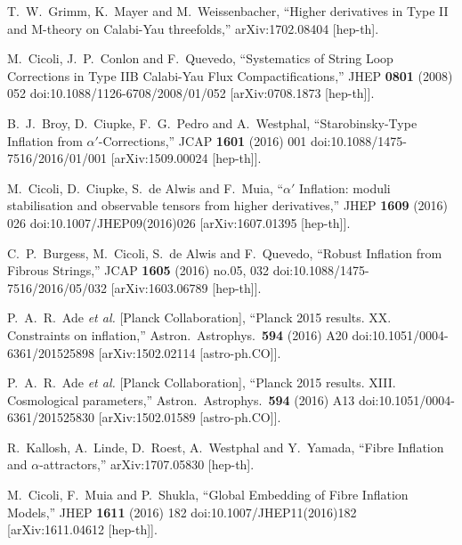 \documentclass[11pt,a4paper]{article}
\begin{document}
\begin{thebibliography}{99}
  T.~W.~Grimm, K.~Mayer and M.~Weissenbacher,
  ``Higher derivatives in Type II and M-theory on Calabi-Yau threefolds,''
  arXiv:1702.08404 [hep-th].

  M.~Cicoli, J.~P.~Conlon and F.~Quevedo,
  ``Systematics of String Loop Corrections in Type IIB Calabi-Yau Flux Compactifications,''
  JHEP {\bf 0801} (2008) 052
  doi:10.1088/1126-6708/2008/01/052
  [arXiv:0708.1873 [hep-th]].
	
  B.~J.~Broy, D.~Ciupke, F.~G.~Pedro and A.~Westphal,
  ``Starobinsky-Type Inflation from $\alpha'$-Corrections,''
  JCAP {\bf 1601} (2016) 001
  doi:10.1088/1475-7516/2016/01/001
  [arXiv:1509.00024 [hep-th]].	
	
  M.~Cicoli, D.~Ciupke, S.~de Alwis and F.~Muia,
  ``$\alpha'$ Inflation: moduli stabilisation and observable tensors from higher derivatives,''
  JHEP {\bf 1609} (2016) 026
  doi:10.1007/JHEP09(2016)026
  [arXiv:1607.01395 [hep-th]].

  C.~P.~Burgess, M.~Cicoli, S.~de Alwis and F.~Quevedo,
  ``Robust Inflation from Fibrous Strings,''
  JCAP {\bf 1605} (2016) no.05,  032
  doi:10.1088/1475-7516/2016/05/032
  [arXiv:1603.06789 [hep-th]].

  P.~A.~R.~Ade {\it et al.} [Planck Collaboration],
  ``Planck 2015 results. XX. Constraints on inflation,''
  Astron.\ Astrophys.\  {\bf 594} (2016) A20
  doi:10.1051/0004-6361/201525898
  [arXiv:1502.02114 [astro-ph.CO]].

  P.~A.~R.~Ade {\it et al.} [Planck Collaboration],
  ``Planck 2015 results. XIII. Cosmological parameters,''
  Astron.\ Astrophys.\  {\bf 594} (2016) A13
  doi:10.1051/0004-6361/201525830
  [arXiv:1502.01589 [astro-ph.CO]].

  R.~Kallosh, A.~Linde, D.~Roest, A.~Westphal and Y.~Yamada,
  ``Fibre Inflation and $\alpha$-attractors,''
  arXiv:1707.05830 [hep-th].

  M.~Cicoli, F.~Muia and P.~Shukla,
  ``Global Embedding of Fibre Inflation Models,''
  JHEP {\bf 1611} (2016) 182
  doi:10.1007/JHEP11(2016)182
  [arXiv:1611.04612 [hep-th]].


\end{thebibliography}
\end{document}
